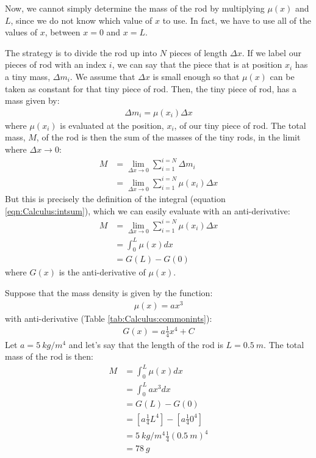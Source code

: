 
Now, we cannot simply determine the mass of the rod by multiplying $\mu(x)$ and $L$, since we do not know which value of $x$ to use. In fact, we have to use all of the values of $x$, between $x=0$ and $x=L$. 

The strategy is to divide the rod up into $N$ pieces of length $\Delta x$. If we label our pieces of rod with an index $i$, we can say that the piece that is at position $x_i$ has a tiny mass, $\Delta m_i$. We assume that $\Delta x$ is small enough so that $\mu(x)$ can be taken as constant for that tiny piece of rod. Then, the tiny piece of rod, has a mass given by:
\begin{align*}
\Delta m_i = \mu(x_i) \Delta x
\end{align*}
where $\mu(x_i)$ is evaluated at the position, $x_i$, of our tiny piece of rod. The total mass, $M$, of the rod is then the sum of the masses of the tiny rods, in the limit where $\Delta x\to 0$:
\begin{align*}
M &= \lim_{\Delta x\to 0}\sum_{i=1}^{i=N}\Delta m_i \\
  &= \lim_{\Delta x\to 0}\sum_{i=1}^{i=N} \mu(x_i) \Delta x
\end{align*}
But this is precisely the definition of the integral (equation \ref{eqn:Calculus:intsum}), which we can easily evaluate with an anti-derivative:
\begin{align*}
M &=\lim_{\Delta x\to 0}\sum_{i=1}^{i=N} \mu(x_i) \Delta x \\
  &= \int_0^L \mu(x) dx \\
  &= G(L) - G(0)
\end{align*}
where $G(x)$ is the anti-derivative of $\mu(x)$.

Suppose that the mass density is given by the function:
\begin{align*}
\mu(x)=ax^3
\end{align*}
with anti-derivative (Table \ref{tab:Calculus:commonints}):
\begin{align*}
G(x)=a\frac{1}{4}x^4 + C
\end{align*}
Let $a=\SI{5}{kg/m^4}$ and let's say that the length of the rod is $L=\SI{0.5}{m}$. The total mass of the rod is then:
\begin{align*}
M&=\int_0^L \mu(x) dx \\
&=\int_0^L ax^3 dx \\
&= G(L)-G(0)\\
&=\left[ a\frac{1}{4}L^4 \right] - \left[ a\frac{1}{4}0^4 \right]\\
&=\SI{5}{kg/m^4}\frac{1}{4}(\SI{0.5}{m})^4 \\
&=\SI{78}{g}\\
\end{align*}

